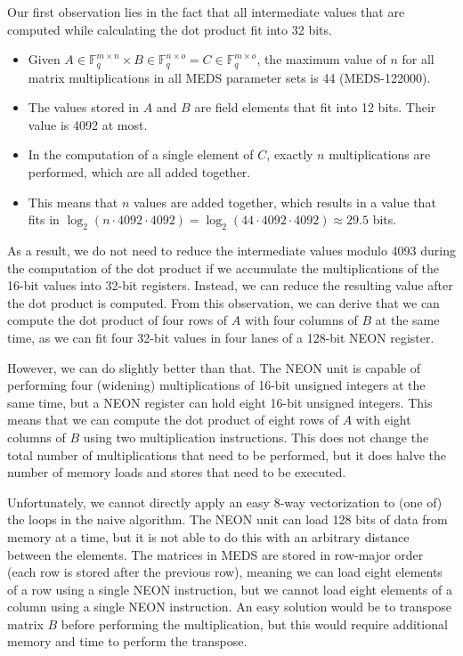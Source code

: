 \documentclass[11pt,a4paper]{report}
\theoremstyle{definition}
\begin{document}
Our first observation lies in the fact that all intermediate values that are computed while calculating the dot product fit into 32 bits.
\begin{itemize}
  \item Given $A \in \mathbb{F}_q^{m \times n} \times B \in \mathbb{F}_q^{n \times o} = C \in \mathbb{F}_q^{m \times o}$, the maximum value of $n$ for all matrix multiplications in all MEDS parameter sets is 44 (MEDS-122000).
  \item The values stored in $A$ and $B$ are field elements that fit into 12 bits. Their value is 4092 at most.
  \item In the computation of a single element of $C$, exactly $n$ multiplications are performed, which are all added together.
  \item This means that $n$ values are added together, which results in a value that fits in $\log_2(n \cdot 4092 \cdot 4092) = \log_2(44 \cdot 4092 \cdot 4092) \approx 29.5$ bits.
\end{itemize}
As a result, we do not need to reduce the intermediate values modulo 4093 during the computation of the dot product if we accumulate the multiplications of the 16-bit values into 32-bit registers. Instead, we can reduce the resulting value after the dot product is computed. From this observation, we can derive that we can compute the dot product of four rows of $A$ with four columns of $B$ at the same time, as we can fit four 32-bit values in four lanes of a 128-bit NEON register.

However, we can do slightly better than that. The NEON unit is capable of performing four (widening) multiplications of 16-bit unsigned integers at the same time, but a NEON register can hold eight 16-bit unsigned integers. This means that we can compute the dot product of eight rows of $A$ with eight columns of $B$ using two multiplication instructions. This does not change the total number of multiplications that need to be performed, but it does halve the number of memory loads and stores that need to be executed.

Unfortunately, we cannot directly apply an easy 8-way vectorization to (one of) the loops in the naive algorithm. The NEON unit can load 128 bits of data from memory at a time, but it is not able to do this with an arbitrary distance between the elements. The matrices in MEDS are stored in row-major order (each row is stored after the previous row), meaning we can load eight elements of a row using a single NEON instruction, but we cannot load eight elements of a column using a single NEON instruction. An easy solution would be to transpose matrix $B$ before performing the multiplication, but this would require additional memory and time to perform the transpose.
\end{document}
